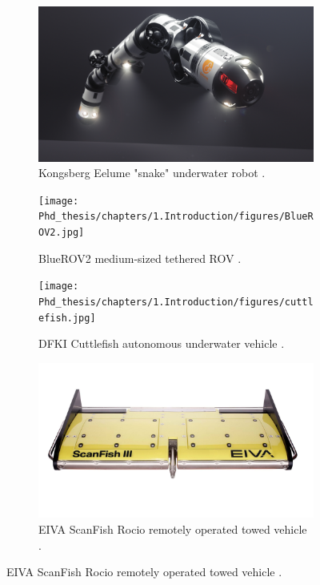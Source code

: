 \begin{figure}[!h]
    \centering
    \begin{subfigure}[b]{0.49\textwidth}
        \centering
        \includegraphics[width=\textwidth]{Phd_thesis/chapters/1.Introduction/figures/eelume.jpg}
        \caption{Kongsberg Eelume "snake" underwater robot \cite{kongsberg_eelume_nodate}.}
        \label{fig:subfig1}
    \end{subfigure}
    \hfill
    \begin{subfigure}[b]{0.49\textwidth}
        \centering
        \texttt{[image: Phd\_thesis/chapters/1.Introduction/figures/BlueROV2.jpg]}
        \caption{BlueROV2 medium-sized tethered ROV \cite{bluerobotics_bluerov2_nodate}.}
        \label{fig:subfig2}
    \end{subfigure}
    
    \vspace{0.5cm} %
    
    \begin{subfigure}[b]{0.49\textwidth}
        \centering
        \texttt{[image: Phd\_thesis/chapters/1.Introduction/figures/cuttlefish.jpg]}
        \caption{DFKI Cuttlefish autonomous underwater vehicle \cite{christensen_cuttlefish_nodate}.}
        \label{fig:subfig3}
    \end{subfigure}
    \hfill
    \begin{subfigure}[b]{0.49\textwidth}
        \centering
        \includegraphics[width=\textwidth]{Phd_thesis/chapters/1.Introduction/figures/scanfish_towed.jpg}
        \caption{EIVA ScanFish Rocio remotely operated towed vehicle \cite{eiva_scanfish_nodate}.}
        \label{fig:subfig4}
    \end{subfigure}
    

\end{figure}
